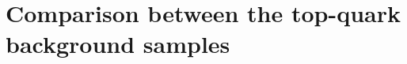 \section{Comparison between the top-quark background samples}\label{dilORnonallhad}
\listoffigures
{}%
\listoftables
{}%
